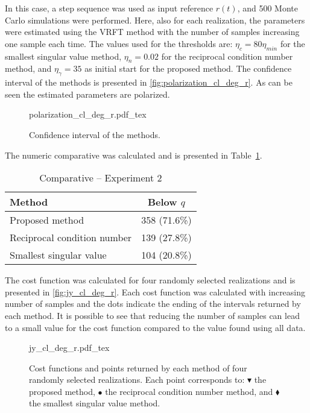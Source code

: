 In this case, a step sequence was used as input reference $r(t)$, and 500 Monte Carlo simulations were performed.
Here, also for each realization, the parameters were estimated using the VRFT method with the number of samples increasing one sample each time.
The values used for the thresholds are: $\eta_c = 80\eta_{min} $ for the smallest singular value method, $\eta_n = 0.02$ for the reciprocal condition number method, and $\eta_\gamma = 35$ as initial start for the proposed method.
The confidence interval of the methods is presented in \autoref{fig:polarization_cl_deg_r}.
As can be seen the estimated parameters are polarized.
\begin{figure}[h!]
  \centering
  \def\svgwidth{\columnwidth}
  {\footnotesize{polarization_cl_deg_r.pdf_tex}}
  \caption{\label{fig:polarization_cl_deg_r} Confidence interval of the methods.}
\end{figure}

The numeric comparative was calculated and is presented in Table~\ref{tab:comp_cl_deg_r}.
\begin{table}[h!]
\caption{Comparative -- Experiment 2 \label{tab:comp_cl_deg_r}}
\centering
\begin{tabular}{lc}
\toprule
Method & Below $q$\\
\midrule
Proposed method & 358 (71.6\%) \\
Reciprocal condition number & 139 (27.8\%) \\
Smallest singular value & 104 (20.8\%) \\
\bottomrule
\end{tabular}
\end{table}

The cost function was calculated for four randomly selected realizations and is presented in \autoref{fig:jy_cl_deg_r}.
Each cost function was calculated with increasing number of samples and the dots indicate the ending of the intervals returned by each method.
It is possible to see that reducing the number of samples can lead to a small value for the cost function compared to the value found using all data.
\begin{figure}[h!]
  \centering
  \def\svgwidth{\columnwidth}
  {\footnotesize{jy_cl_deg_r.pdf_tex}}
  \caption{\label{fig:jy_cl_deg_r} Cost functions and points returned by each method of four randomly selected realizations. Each point corresponds to: $\blacktriangledown$ the proposed method, $\bullet$ the reciprocal condition number method, and $\blacklozenge$ the smallest singular value method.}
\end{figure}

